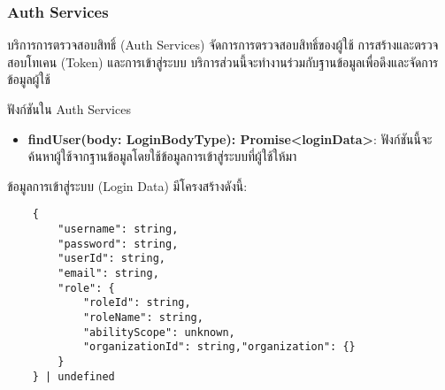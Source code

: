 \subsubsection{Auth Services}
\ifenglish
\else
บริการการตรวจสอบสิทธิ์ (Auth Services) จัดการการตรวจสอบสิทธิ์ของผู้ใช้ การสร้างและตรวจสอบโทเคน (Token) และการเข้าสู่ระบบ บริการส่วนนี้จะทำงานร่วมกับฐานข้อมูลเพื่อดึงและจัดการข้อมูลผู้ใช้

ฟังก์ชันใน Auth Services

\begin{itemize}
    \item \textbf{findUser(body: LoginBodyType): Promise<loginData>}: ฟังก์ชันนี้จะค้นหาผู้ใช้จากฐานข้อมูลโดยใช้ข้อมูลการเข้าสู่ระบบที่ผู้ใช้ให้มา
\end{itemize}
ข้อมูลการเข้าสู่ระบบ (Login Data) มีโครงสร้างดังนี้:
\begin{lstlisting}
    {
        "username": string, 
        "password": string, 
        "userId": string, 
        "email": string, 
        "role": {
            "roleId": string, 
            "roleName": string, 
            "abilityScope": unknown,
            "organizationId": string,"organization": {}
        }
    } | undefined
\end{lstlisting}
\fi